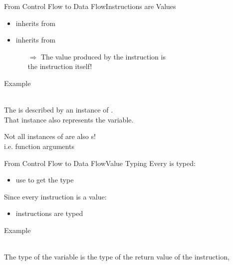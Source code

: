 \begin{frame}{From Control Flow to Data Flow}{Instructions are Values}
\vfill
\begin{itemize}
\item {} inherits from 
\item {} inherits from 
\begin{itemize}
\normalsize
\item[$\Rightarrow$] The value produced by the instruction is\\the \alert{instruction itself}!
\end{itemize}
\end{itemize}

\begin{block}{Example}
\begin{center}
\\
\medskip
The  is described by an instance of . \\
That instance also represents the  variable. \\
\end{center}
\end{block}

\begin{center}
Not all instances of  are also s!\\
\smallskip
{\small i.e. function arguments}

\end{center}
\vfill
\end{frame}


\begin{frame}{From Control Flow to Data Flow}{Value Typing}
Every  is typed:

\begin{itemize}
\item use  to get the type
\end{itemize}

\vfill
Since every instruction is a value:

\begin{itemize}
\item instructions are typed
\end{itemize}

\vfill
\begin{block}{Example}
\begin{center}
\\
\medskip
The type of the  variable is the type of the return value of the  instruction, \\
\end{center}
\end{block}
\end{frame}


